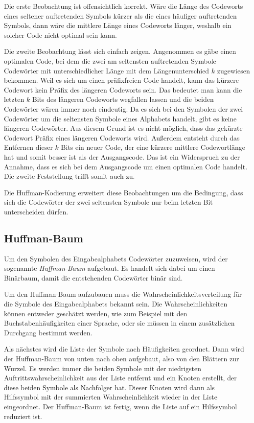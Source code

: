 \documentclass[twoside,11pt,a4paper]{article}
\theoremstyle{break}
\begin{document}
Die erste Beobachtung ist offensichtlich korrekt. Wäre die Länge des
Codeworts eines seltener auftretenden Symbols kürzer als die eines
häufiger auftretenden Symbols, dann wäre die mittlere Länge eines
Codeworts länger, weshalb ein solcher Code nicht optimal sein kann.

Die zweite Beobachtung lässt sich einfach zeigen. Angenommen es gäbe
einen optimalen Code, bei dem die zwei am seltensten auftretenden
Symbole Codewörter mit unterschiedlicher Länge mit dem
Längenunterschied $k$ zugewiesen bekommen. Weil es sich um einen
präfixfreien Code handelt, kann das kürzere Codewort kein Präfix des
längeren Codeworts sein. Das bedeutet man kann die letzten $k$ Bits
des längeren Codeworts wegfallen lassen und die beiden Codewörter
wären immer noch eindeutig. Da es sich bei den Symbolen der zwei
Codewörter um die seltensten Symbole eines Alphabets handelt, gibt
es keine längeren Codewörter. Aus diesem Grund ist es nicht möglich,
dass das gekürzte Codewort Präfix eines längeren Codeworts
wird. Außerdem entsteht durch das Entfernen dieser $k$ Bits ein neuer
Code, der eine kürzere mittlere Codewortlänge hat und somit besser ist
als der Ausgangscode. Das ist ein Widerspruch zu der Annahme, dass es
sich bei dem Ausgangscode um einen optimalen Code handelt. Die zweite
Feststellung trifft somit auch zu.

Die Huffman-Kodierung erweitert diese Beobachtungen um die Bedingung,
dass sich die Codewörter der zwei seltensten Symbole nur beim letzten
Bit unterscheiden dürfen.

\subsection{Huffman-Baum} \label{sec:HTREE}
Um den Symbolen des Eingabealphabets Codewörter zuzuweisen, wird der
sogenannte \emph{Huffman-Baum} aufgebaut. Es handelt sich dabei um
einen Binärbaum, damit die entstehenden Codewörter binär sind.

Um den Huffman-Baum aufzubauen muss die Wahrscheinlichkeitsverteilung
für die Symbole des Eingabealphabets bekannt sein. Die
Wahrscheinlichkeiten können entweder geschätzt werden, wie zum
Beispiel mit den Buchstabenhäufigkeiten einer Sprache, oder sie müssen
in einem zusätzlichen Durchgang bestimmt werden.

Als nächstes wird die Liste der Symbole nach Häufigkeiten geordnet.
Dann wird der Huffman-Baum von unten nach oben aufgebaut, also von den
Blättern zur Wurzel. Es werden immer die beiden Symbole mit der
niedrigsten Auftrittswahrscheinlichkeit aus der Liste entfernt und ein
Knoten erstellt, der diese beiden Symbole als Nachfolger hat. Dieser
Knoten wird dann als Hilfssymbol mit der summierten Wahrscheinlichkeit
wieder in der Liste eingeordnet. Der Huffman-Baum ist fertig, wenn die
Liste auf ein Hilfssymbol reduziert ist.
\end{document}
